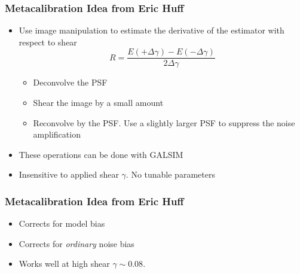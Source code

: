 \documentclass{beamer}
\begin{document}
\frame
{
    \frametitle{Metacalibration Idea from Eric Huff}


    \begin{itemize}

        \item Use image manipulation to estimate the derivative of the
            estimator with respect to shear
            {\color{gold}
                \begin{equation}
                    R = \frac{E(+\Delta\gamma) - E(-\Delta\gamma)}{2 \Delta \gamma} \nonumber 
                \end{equation}
            }
            \begin{itemize}
                \item Deconvolve the PSF
                \item Shear the image by a small amount
                \item Reconvolve by the PSF.  Use a slightly larger PSF to suppress
                    the noise amplification
            \end{itemize}

            \item These operations can be done with GALSIM
            \item Insensitive to applied shear $\gamma$.  {\color{lightskyblue} No tunable parameters}


    \end{itemize}

}

\frame
{
    \frametitle{Metacalibration Idea from Eric Huff}

 
    \begin{itemize}
        
        \item Corrects for {\color{lightskyblue} model bias}

        \item Corrects for {\em ordinary} {\color{gold} noise bias}

        \item Works well at {\color{lightsteelblue} high shear $\gamma \sim 0.08$}.

    \end{itemize}

}
\end{document}
